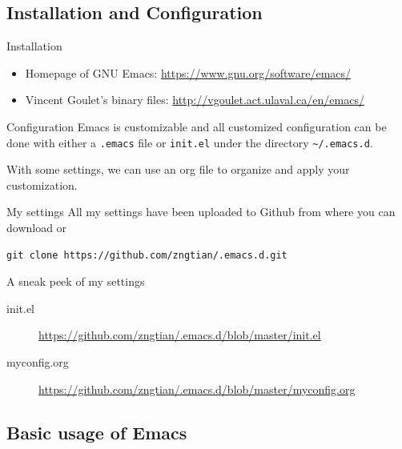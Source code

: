 \documentclass[presentation]{beamer}
\begin{document}
\subsection{Installation and Configuration}
\label{sec:org60f1bf4}

\begin{frame}[label={sec:org8dcdfca}]{Installation}
\begin{itemize}
\item Homepage of GNU Emacs: \url{https://www.gnu.org/software/emacs/}

\item Vincent Goulet's binary files:
\url{http://vgoulet.act.ulaval.ca/en/emacs/}
\end{itemize}
\end{frame}

\begin{frame}[fragile,label={sec:orgf66d4dc}]{Configuration}
 Emacs is customizable and all customized configuration can be done
with either a \texttt{.emacs} file or \texttt{init.el} under the directory
\texttt{\textasciitilde{}/.emacs.d}.

With some settings, we can use an org file to organize and apply your
customization.
\end{frame}

\begin{frame}[fragile,label={sec:org2f3ab2c}]{My settings}
 All my settings have been uploaded to Github from where you can
download or

\begin{verbatim}
git clone https://github.com/zngtian/.emacs.d.git
\end{verbatim}

\begin{block}{A sneak peek of my settings}
\begin{description}
\item[{init.el}] \url{https://github.com/zngtian/.emacs.d/blob/master/init.el}
\item[{myconfig.org}] \url{https://github.com/zngtian/.emacs.d/blob/master/myconfig.org}
\end{description}
\end{block}
\end{frame}

\subsection{Basic usage of Emacs}
\label{sec:org9456ea9}
\end{document}
